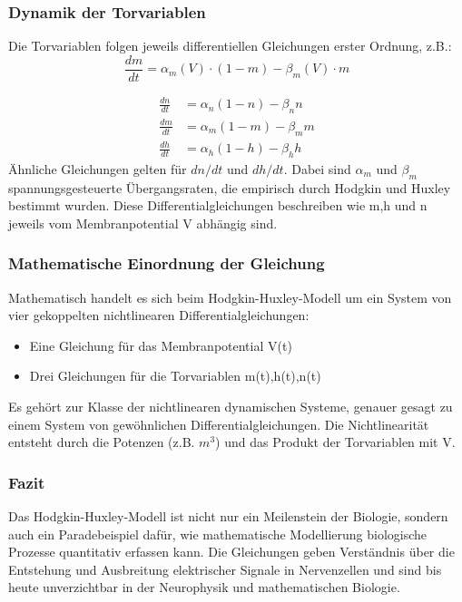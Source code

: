 \begin{refsection}
\subsubsection{Dynamik der Torvariablen}
Die Torvariablen folgen jeweils differentiellen Gleichungen erster Ordnung, z.B.:
\[\frac{dm}{dt} = \alpha_m(V) \cdot (1 - m) - \beta_m(V) \cdot m\]

\begin{align}
	\frac{dn}{dt} &= \alpha_n (1 - n) - \beta_n n \tag{3.11} \\
	\frac{dm}{dt} &= \alpha_m (1 - m) - \beta_m m \tag{3.12} \\
	\frac{dh}{dt} &= \alpha_h (1 - h) - \beta_h h \tag{3.13}
\end{align}
\noindent
Ähnliche Gleichungen gelten für $dn/dt$ und $dh/dt$. Dabei sind $\alpha_m$ und $\beta_m$ spannungsgesteuerte Übergangsraten, die empirisch durch Hodgkin und Huxley bestimmt wurden.
Diese Differentialgleichungen beschreiben wie m,h und n jeweils vom Membranpotential V abhängig sind.
\subsubsection{Mathematische Einordnung der Gleichung}
Mathematisch handelt es sich beim Hodgkin-Huxley-Modell um ein System von vier gekoppelten nichtlinearen
Differentialgleichungen:
\begin{itemize}
    \item Eine Gleichung für das Membranpotential V(t)
    \item Drei Gleichungen für die Torvariablen m(t),h(t),n(t)
\end{itemize}
\noindent
Es gehört zur Klasse der nichtlinearen dynamischen Systeme, genauer gesagt zu einem System von gewöhnlichen Differentialgleichungen. Die Nichtlinearität entsteht durch die Potenzen (z.B. $m^3$) und das Produkt der Torvariablen mit V.
\subsubsection{Fazit}
Das Hodgkin-Huxley-Modell ist nicht nur ein Meilenstein der Biologie, sondern auch ein Paradebeispiel dafür, wie mathematische Modellierung biologische Prozesse quantitativ erfassen kann. Die Gleichungen geben Verständnis über die Entstehung und Ausbreitung elektrischer Signale in Nervenzellen und sind bis heute unverzichtbar in der Neurophysik und mathematischen Biologie.

\end{refsection}
